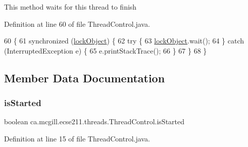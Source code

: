 This method waits for this thread to finish 

Definition at line 60 of file Thread\+Control.\+java.


\begin{DoxyCode}
60                                   \{
61     \textcolor{keyword}{synchronized} (\hyperlink{classca_1_1mcgill_1_1ecse211_1_1threads_1_1_thread_control_ab20c44ff2dafab8981c42fa8bf634dfc}{lockObject}) \{
62       \textcolor{keywordflow}{try} \{
63         \hyperlink{classca_1_1mcgill_1_1ecse211_1_1threads_1_1_thread_control_ab20c44ff2dafab8981c42fa8bf634dfc}{lockObject}.wait();
64       \} \textcolor{keywordflow}{catch} (InterruptedException e) \{
65         e.printStackTrace();
66       \}
67     \}
68   \}
\end{DoxyCode}


\subsection{Member Data Documentation}
\mbox{\label{classca_1_1mcgill_1_1ecse211_1_1threads_1_1_thread_control_abb0ba2385c212f3d0d8435267d882536}} 
\subsubsection{\texorpdfstring{is\+Started}{isStarted}}
{\footnotesize\ttfamily boolean ca.\+mcgill.\+ecse211.\+threads.\+Thread\+Control.\+is\+Started\hspace{0.3cm}{\ttfamily [protected]}}



Definition at line 15 of file Thread\+Control.\+java.

\mbox{\label{classca_1_1mcgill_1_1ecse211_1_1threads_1_1_thread_control_ab20c44ff2dafab8981c42fa8bf634dfc}} 
